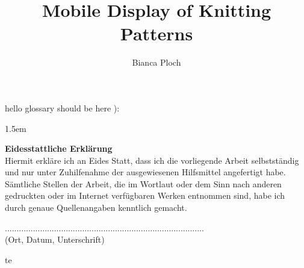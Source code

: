\author{Bianca Ploch}
\title{Mobile Display of Knitting Patterns}




\makeglossaries




% 






\newpage
hello glossary should be here ):
\printglossary[type=\acronymtype,title={Abbreviations}]

\newpage 
\sloppy %
\emergencystretch 1.5em %
\listoffigures

\newpage
\lstlistoflistings

\printbibliography


\begin{appendix}
   \clearpage
   
\end{appendix}

\newpage
\thispagestyle{empty}

\noindent \textbf{Eidesstattliche Erklärung}\\

\noindent Hiermit erkläre ich an Eides Statt, dass ich die vorliegende Arbeit selbstständig und nur unter
Zuhilfenahme der ausgewiesenen Hilfsmittel angefertigt habe.
Sämtliche Stellen der Arbeit, die im Wortlaut oder dem Sinn nach anderen gedruckten oder
im Internet verfügbaren Werken entnommen sind, habe ich durch genaue Quellenangaben
kenntlich gemacht.

\vspace*{1.5cm}
\noindent .....................................................................................\\
(Ort, Datum, Unterschrift)

te